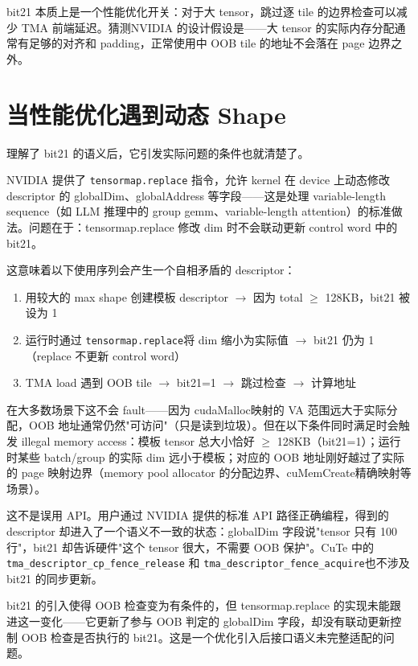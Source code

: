 bit21 本质上是一个性能优化开关：对于大 tensor，跳过逐 tile 的边界检查可以减少 TMA 前端延迟。猜测NVIDIA 的设计假设是——大 tensor 的实际内存分配通常有足够的对齐和 padding，正常使用中 OOB tile 的地址不会落在 page 边界之外。

\section{当性能优化遇到动态 Shape}

理解了 bit21 的语义后，它引发实际问题的条件也就清楚了。

NVIDIA 提供了 \lstinline|tensormap.replace| 指令，允许 kernel 在 device 上动态修改 descriptor 的 globalDim、globalAddress 等字段——这是处理 variable-length sequence（如 LLM 推理中的 group gemm、variable-length attention）的标准做法。问题在于：tensormap.replace 修改 dim 时不会联动更新 control word 中的 bit21。

这意味着以下使用序列会产生一个自相矛盾的 descriptor：

\begin{enumerate}
  \item 用较大的 max shape 创建模板 descriptor $\rightarrow$ 因为 total $\geq$ 128KB，bit21 被设为 1
  \item 运行时通过 \lstinline|tensormap.replace|将 dim 缩小为实际值 $\rightarrow$ bit21 仍为 1（replace 不更新 control word）
  \item TMA load 遇到 OOB tile $\rightarrow$ bit21=1 $\rightarrow$ 跳过检查 $\rightarrow$ 计算地址
\end{enumerate}

在大多数场景下这不会 fault——因为 cudaMalloc映射的 VA 范围远大于实际分配，OOB 地址通常仍然"可访问"（只是读到垃圾）。但在以下条件同时满足时会触发 illegal memory access：模板 tensor 总大小恰好 $\geq$ 128KB（bit21=1）；运行时某些 batch/group 的实际 dim 远小于模板；对应的 OOB 地址刚好越过了实际的 page 映射边界（memory pool allocator 的分配边界、cuMemCreate精确映射等场景）。

这不是误用 API。用户通过 NVIDIA 提供的标准 API 路径正确编程，得到的 descriptor 却进入了一个语义不一致的状态：globalDim 字段说"tensor 只有 100 行"，bit21 却告诉硬件"这个 tensor 很大，不需要 OOB 保护"。CuTe 中的 \lstinline|tma_descriptor_cp_fence_release| 和 \lstinline|tma_descriptor_fence_acquire|也不涉及 bit21 的同步更新。

bit21 的引入使得 OOB 检查变为有条件的，但 tensormap.replace 的实现未能跟进这一变化——它更新了参与 OOB 判定的 globalDim 字段，却没有联动更新控制 OOB 检查是否执行的 bit21。这是一个优化引入后接口语义未完整适配的问题。


